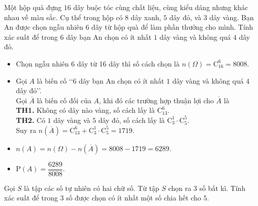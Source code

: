 \begin{vd}
	Một hộp quà đựng $16$ dây buộc tóc cùng chất liệu, cùng kiểu dáng nhưng khác nhau về màu sắc. Cụ thể trong hộp có $8$ dây xanh, $5$ dây đỏ, và $3$ dây vàng. Bạn An được chọn ngẫu nhiên 6 dây từ hộp quà để làm phần thưởng cho mình. Tính xác suất để trong $6$ dây bạn An chọn có ít nhất $1$ dây vàng và không quá $4$ dây đỏ.
	\loigiai
	{
		\begin{itemize}
			\item Chọn ngẫu nhiên 6 dây từ 16 dây thì số cách chọn là $n(\Omega)=\mathrm{C}_{16}^6=8008$.
			\item Gọi $A$ là biến cố \lq\lq  $6$ dây bạn An chọn có ít nhất $1$ dây vàng và không quá $4$ dây đỏ\rq\rq.\\
			Gọi $\overline{A}$ là biến cố đối của $A$, khi đó các trường hợp thuận lợi cho $\overline{A}$ là\\
			\textbf{TH1.} Không có dây nào vàng, số cách lấy là $\mathrm{C}_{13}^6$.\\
			\textbf{TH2.} Có $1$ dây vàng và $5$ dây đỏ, số cách lấy là $\mathrm{C}_{3}^1 \cdot \mathrm{C}_{5}^5$.\\
			Suy ra $n(\overline{A})=\mathrm{C}_{13}^6 + \mathrm{C}_{3}^1 \cdot \mathrm{C}_{5}^5=1719$.
			\item $n(A)=n(\Omega)-n(\overline{A})=8008-1719=6289$.
			\item $\mathrm{P}(A)=\dfrac{6289}{8008}$.
		\end{itemize}
	}
\end{vd}
\begin{vd}
	Gọi $S$ là tập các số tự nhiên có hai chữ số. Từ tập $S$ chọn ra $3$ số bất kì. Tính xác suất để trong $3$ số được chọn có ít nhất một số chia hết cho $5$.
\end{vd}
